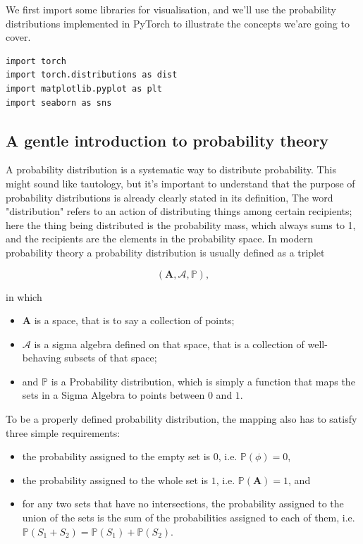 \documentclass[11pt]{article}
\begin{document}
We first import some libraries for visualisation, and we'll use the probability distributions implemented in PyTorch to illustrate the concepts we'are going to cover.

\begin{verbatim}
import torch
import torch.distributions as dist
import matplotlib.pyplot as plt
import seaborn as sns
\end{verbatim}

\subsection{A gentle introduction to probability theory}
\label{sec:org1f313bd}

A probability distribution is a systematic way to distribute probability. This might sound like tautology, but it's important to understand that the purpose of probability distributions is already clearly stated in its definition, The word "distribution" refers to an action of distributing things among certain recipients; here the thing being distributed is the probability mass, which always sums to 1, and the recipients are the elements in the probability space. In modern probability theory a probability distribution is usually defined as a triplet

$$(\mathbf{A}, \mathcal{A}, \mathbb{P}),$$

in which

\begin{itemize}
\item \(\mathbf{A}\) is a space, that is to say a collection of points;
\item \(\mathcal{A}\) is a sigma algebra defined on that space, that is a collection of well-behaving subsets of that space;
\item and \(\mathbb{P}\) is a Probability distribution, which is simply a function that maps the sets in a Sigma Algebra to points between \(0\) and \(1\).
\end{itemize}

To be a properly defined probability distribution, the mapping also has to satisfy three simple requirements:

\begin{itemize}
\item the probability assigned to the empty set is \(0\), i.e. \(\mathbb{P}(\phi)=0\),
\item the probability assigned to the whole set is \(1\), i.e. \(\mathbb{P}(\mathbf{A})=1\), and
\item for any two sets that have no intersections, the probability assigned to the union of the sets is the sum of the probabilities assigned to each of them, i.e. \(\mathbb{P}(S_1 + S_2) = \mathbb{P}(S_1) + \mathbb{P}(S_2)\).
\end{itemize}
\end{document}
